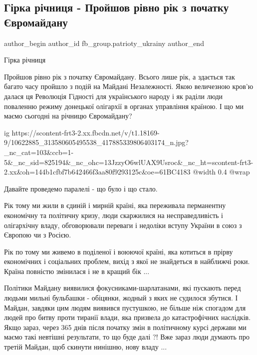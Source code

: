  
 
 
 
 
 
\subsection{Гірка річниця - Пройшов рівно рік з початку Євромайдану}
\label{sec:21_11_2014.fb.fb_group.patrioty_ukrainy.1.godovschina_evromaidan}
 
\ifcmt
 author_begin
   author_id fb_group.patrioty_ukrainy
 author_end
\fi

Гірка річниця

Пройшов рівно рік з початку Євромайдану. Всього лише рік, а здається так багато
часу пройшло з подій на Майдані Незалежності. Якою величезною кров'ю далася ця
Революція Гідності для українського народу і як раділи люди поваленню режиму
донецької олігархії в органах управління країною. І що ми маємо сьогодні на
річницю Євромайдану?

\ifcmt
  ig https://scontent-frt3-2.xx.fbcdn.net/v/t1.18169-9/10622885_313580605495538_417885339806403174_n.jpg?_nc_cat=103&ccb=1-5&_nc_sid=825194&_nc_ohc=13JzzyO6wlUAX9Usroc&_nc_ht=scontent-frt3-2.xx&oh=144b1cfbf7b642466f3aa80f9293125c&oe=61BC4183
  @width 0.4
  @wrap 
\fi

Давайте проведемо паралелі - що було і що стало.

Рік тому ми жили в єдиній і мирній країні, яка переживала перманентну
економічну та політичну кризу, люди скаржилися на несправедливість і
олігархічну владу, обговорювали переваги і недоліки вступу України в союз з
Європою чи з Росією.

Рік по тому ми живемо в поділеної і воюючої країні, яка котиться в прірву
економічних і соціальних проблем, вихід з якої не знайдеться в найближчі роки.
Країна повністю змінилася і не в кращий бік ...

Політики Майдану виявилися фокусниками-шарлатанами, які пускають перед людьми
мильні бульбашки - обіцянки, жодный з яких не судилося збутися. І Майдан,
завдяки цим людям виявився пустушкою, не більше ніж спогадом для людей про
битву проти тиранії влади, яка призвела до катастрофічних наслідків. Якщо
зараз, через 365 днів після початку змін в політичному курсі держави ми маємо
такі невтішні результати, то що буде далі ?! Вже зараз люди думають про третій
Майдан, щоб скинути нинішню, нову владу ...

